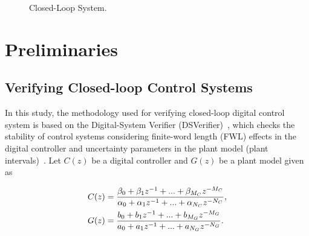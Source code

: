 \documentclass{sig-alternate-05-2015}
\begin{document}
\begin{figure}
\centering
{}
 \caption{Closed-Loop System. \label{fig:closed-system}}
\end{figure}

\section{Preliminaries}

\subsection{Verifying Closed-loop Control Systems}
\label{verifying-closed-loop-control-systems}

In this study, the methodology used for verifying closed-loop digital control system is based on the Digital-System Verifier (DSVerifier)~\cite{IsmailBCFF15}, which checks the stability of control systems considering finite-word length (FWL) effects in the digital controller and uncertainty parameters in the plant model (plant intervals)~\cite{Bessa16}. Let $C(z)$ be a digital controller and $G(z)$ be a plant model given as

\begin{align}
\small
\label{controller_plant_tf}
C(z)&=\frac{\beta_{0}+\beta_{1}z^{-1}+...+\beta_{M_C}z^{-M_C}}{\alpha_{0}+\alpha_{1}z^{-1}+...+\alpha_{N_C}z^{-N_C}}, \\
G(z)&=\frac{b_{0}+b_{1}z^{-1}+...+b_{M_G}z^{-M_G}}{a_{0}+a_{1}z^{-1}+...+a_{N_G}z^{-N_G}}.
\end{align}
\end{document}
